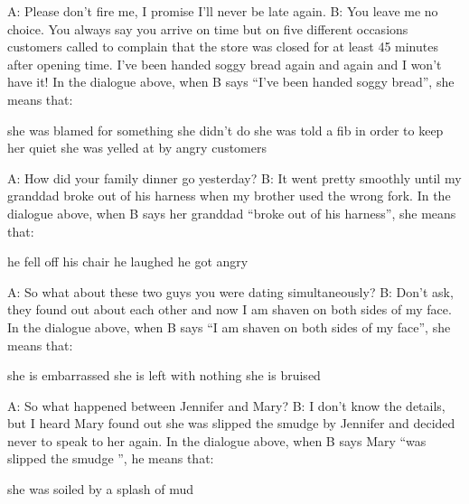 \documentclass[output=paper]{langsci/langscibook}
\begin{document}
\begin{paperappendix}
{\begin{exe}
     \begin{xlist}
        \sn A: Please don't fire me, I promise I’ll never be late again.
        \sn B: You leave me no choice. You always say you arrive on time but on five different occasions customers called to complain that the store was closed for at least 45 minutes after opening time. I've been handed soggy bread again and again and I won't have it!
        \sn In the dialogue above, when B says \enquote{I've been handed soggy bread}, she means that:
        \begin{xlist}
         she was blamed for something she didn't do
         she was told a fib in order to keep her quiet
         she was yelled at by angry customers
        \end{xlist}
        \end{xlist}
     \begin{xlist}
        \sn A: How did your family dinner go yesterday?
        \sn B: It went pretty smoothly until my granddad broke out of his harness when my brother used the wrong fork.
        \sn In the dialogue above, when B says her granddad \enquote{broke out of his harness}, she means that:
        \begin{xlist}
         he fell off his chair
         he laughed
         he got angry
        \end{xlist}
        \end{xlist}
     \begin{xlist}
        \sn A: So what about these two guys you were dating simultaneously?
        \sn B: Don’t ask, they found out about each other and now I am shaven on both sides of my face.
        \sn In the dialogue above, when B says \enquote{I am shaven on both sides of my face}, she means that:
        \begin{xlist}
         she is embarrassed
         she is left with nothing
         she is bruised
        \end{xlist}
        \end{xlist}
     \begin{xlist}
        \sn A: So what happened between Jennifer and Mary?
        \sn B: I don't know the details, but I heard Mary found out she was slipped the smudge by Jennifer and decided never to speak to her again.
        \sn In the dialogue above, when B says Mary \enquote{was slipped the smudge }, he means that:
        \begin{xlist}
         she was soiled by a splash of mud

\end{xlist}
\end{xlist}
\end{exe}}
\end{paperappendix}
\end{document}
